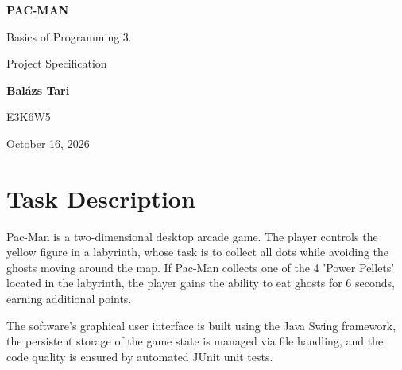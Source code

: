 \documentclass[11pt, a4paper]{article}
\begin{document}
\begin{titlepage}
    \centering
    \vspace*{4cm}
    {\Huge \textbf{PAC-MAN} \par}
    \vspace{1.5cm}
    {\LARGE Basics of Programming 3. \par}
    \vspace{0.5cm}
    {\Large Project Specification \par}
    
    \vspace{4.5cm}
    
    {\Large \textbf{Balázs Tari} \par}
    \vspace{0.3cm}
    {\Large E3K6W5 \par}
    
    \vfill
    
    {\large October 16, 2026 \par}
    \vspace{0.2cm}
\end{titlepage}

\tableofcontents
\newpage

\section{Task Description}
Pac-Man is a two-dimensional desktop arcade game. The player controls the yellow figure in a labyrinth, whose task is to collect all dots while avoiding the ghosts moving around the map. If Pac-Man collects one of the 4 'Power Pellets' located in the labyrinth, the player gains the ability to eat ghosts for 6 seconds, earning additional points. 

The software's graphical user interface is built using the Java Swing framework, the persistent storage of the game state is managed via file handling, and the code quality is ensured by automated JUnit unit tests.

\end{document}

